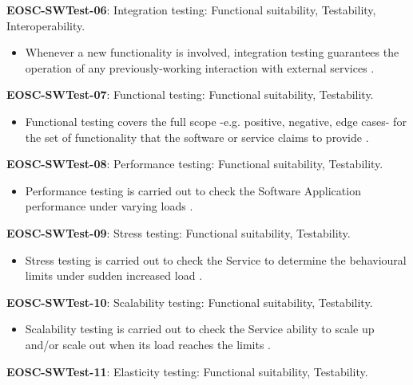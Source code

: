 \textbf{EOSC-SWTest-06}: Integration testing: Functional suitability, Testability, Interoperability.

\begin{itemize}
    \item Whenever a new functionality is involved, integration testing guarantees the operation of any previously-working interaction with external services \cite{iso_25010_2011_2017,orviz_fernandez_eosc-synergy_2020}.
\end{itemize}

\textbf{EOSC-SWTest-07}: Functional testing: Functional suitability, Testability.

\begin{itemize}
    \item Functional testing covers the full scope -e.g. positive, negative, edge cases- for the set of functionality that the software or service claims to provide \cite{iso_25010_2011_2017,orviz_fernandez_eosc-synergy_2020}.
\end{itemize}

\textbf{EOSC-SWTest-08}: Performance testing: Functional suitability, Testability.

\begin{itemize}
    \item Performance testing is carried out to check the Software Application performance under varying loads \cite{iso_25010_2011_2017,orviz_fernandez_eosc-synergy_2020}.
\end{itemize}

\textbf{EOSC-SWTest-09}: Stress testing: Functional suitability, Testability.

\begin{itemize}
    \item Stress testing is carried out to check the Service to determine the behavioural limits under sudden increased load \cite{orviz_fernandez_eosc-synergy_2020}.
\end{itemize}

\textbf{EOSC-SWTest-10}: Scalability testing: Functional suitability, Testability.

\begin{itemize}
    \item Scalability testing is carried out to check the Service ability to scale up and/or scale out when its load reaches the limits \cite{orviz_fernandez_eosc-synergy_2020}.
\end{itemize}

\textbf{EOSC-SWTest-11}: Elasticity testing: Functional suitability, Testability.

